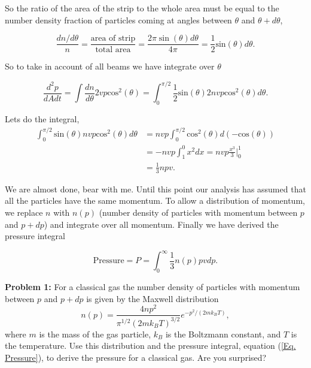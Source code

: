 \documentclass{article}
\begin{document}
\noindent
So the ratio of the area of the strip to the whole area must be equal to the number density fraction of particles coming at angles between $\theta$ and $\theta + d\theta$,

\begin{equation*}
\frac{dn/d\theta}{n} = \frac{\mathrm{area \,\, of \,\, strip}}{\mathrm{total \,\, area}} = \frac{2\pi \mathrm{\sin}(\theta) d\theta}{4\pi} =
\frac{1}{2} \mathrm{sin}(\theta) d\theta.
\end{equation*}

\noindent
So to take in account of all beams we have integrate over $\theta$

\begin{equation*}
\frac{d^2 p}{dA dt} = \int \frac{dn}{d\theta} 2 v p \mathrm{cos}^2(\theta) = \int_{0}^{\pi/2} \frac{1}{2} \mathrm{sin}(\theta) 2 n v p \mathrm{cos}^2 (\theta) d\theta.
\end{equation*}

\noindent
Lets do the integral, 
\begin{align*}
\int_{0}^{\pi/2} \mathrm{sin}(\theta) n v p \mathrm{cos}^2 (\theta) d\theta & = nvp \int_{0}^{\pi/2} \mathrm{cos}^2 (\theta) d(-\mathrm{cos}(\theta)) \\
& = -nvp \int_{1}^{0} x^2 dx = nvp \frac{x^3}{3} \bigg|_{0}^{1} \\
& = \frac{1}{3} n p v.
\end{align*}

\noindent
We are almost done, bear with me. Until this point our analysis has assumed that all the particles have the same momentum. To allow a distribution of momentum, we replace $n$ with $n(p)$ (number density of particles with momentum between $p$ and $p + dp$) and integrate over all momentum. Finally we have derived the pressure integral

\begin{equation}
\label{Eq. Pressure}
\boxed{\mathrm{Pressure} = P = \int_{0}^{\infty} \frac{1}{3} n(p) p v dp.}
\end{equation}

\bigskip
\noindent
\textbf{Problem 1:}  For a classical gas the number density  of particles with momentum between $p$ and $p + dp$ is given by the Maxwell distribution
\begin{equation*}
n(p) = \frac{4 n p^2}{\pi^{1/2} (2 m k_B T)^{3/2}} e^{-p^2/(2 m k_B T)},
\end{equation*}
where $m$ is the mass of the gas particle, $k_B$ is the Boltzmann constant, and $T$ is the temperature. Use this distribution and the pressure integral, equation (\ref{Eq. Pressure}), to derive the pressure for a classical gas. Are you surprised?
\end{document}
